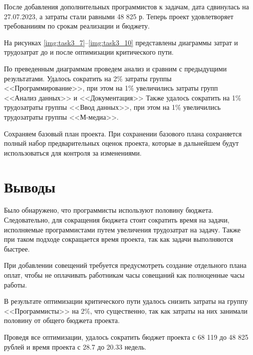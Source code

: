 \documentclass{bmstu}
\begin{document}

После добавления дополнительных программистов к задачам, дата сдвинулась на 27.07.2023, а затраты стали равными 48 825 р. Теперь проект удовлетворяет требованииям по срокам реализации и бюджету.


На рисунках \ref{img:task3_7}--\ref{img:task3_10} представлены диаграммы затрат и трудозатрат до и после оптимизации критического пути.

По преведенным диаграммам проведем анализ и сравним с предыдущими результатами.
Удалось сократить на 2\% затраты группы <<Программирование>>, при этом на 1\% увеличились затраты групп <<Анализ данных>> и <<Документация>>
Также удалось сократить на 1\% трудозатраты группы <<Ввод данных>>, при этом на 1\% увеличились трудозатраты группы <<М-медиа>>.

\clearpage



\clearpage



\clearpage

Сохраняем базовый план проекта. При сохранении базового плана сохраняется полный набор предварительных оценок проекта, которые в дальнейшем будут использоваться для контроля за изменениями.


\section*{Выводы}

Было обнаружено, что программисты используют половину бюджета. Следовательно, для сокращения бюджета стоит сократить время на задачи, исполняемые программистами путем увеличения трудозатрат на задачу. Также при таком подходе сокращается время проекта, так как задачи выполняются быстрее.

При добавлении совещений требуется предусмотреть создание отдельного плана оплат, чтобы не оплачивать работникам часы совещаний как полноценные часы работы.

В результате оптимизации критического пути удалось снизить затраты на группу <<Программисты>> на 2\%, что существенно, так как затраты на них занимали половину от общего бюджета проекта.

Проведя все оптимизации, удалось сократить бюджет проекта с 68 119 до 48 825 рублей и время проекта с 28.7 до 20.33 недель.
\end{document}
